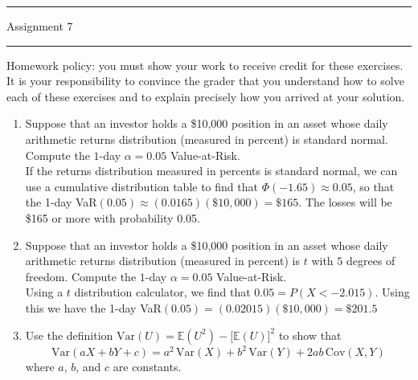 \documentclass[letterpaper,12pt,fleqn]{article}
\begin{document}
\pagestyle{empty}

\hrule \vspace{0.5em}
 \hfill Assignment 7 \newline \hrule

\vspace{1em}

Homework policy: you must show your work to receive credit for these exercises.  It is your responsibility to convince the grader that you understand how to solve each of these exercises and to explain precisely how you arrived at your solution.

\vspace{1em}

\begin{enumerate}
\item Suppose that an investor holds a \$10,000 position in an asset whose daily arithmetic returns distribution (measured in percent) is standard normal.  Compute the $1$-day $\alpha=0.05$ Value-at-Risk.
\\

If the returns distribution measured in percents is standard normal, we can use a cumulative distribution table to find that $\Phi(-1.65) \approx 0.05$, so that the 1-day VaR$(0.05) \approx (0.0165)(\$10,000) = \$165$. The losses will be \$165 or more with probability 0.05. 

\vspace{2em}

\item Suppose that an investor holds a \$10,000 position in an asset whose daily arithmetic returns distribution (measured in percent) is $t$ with $5$ degrees of freedom.  Compute the $1$-day $\alpha=0.05$ Value-at-Risk.
\\

Using a $t$ distribution calculator, we find that $0.05=P(X<-2.015)$. Using this we have the 1-day VaR$(0.05) = (0.02015)(\$10,000) = \$201.5$

\vspace{2em}

\item Use the definition $\mbox{Var}(U) = \mathbb{E}(U^{2}) - \big[ \mathbb{E}(U) \big]^2$ to show that
\begin{equation*}
\mbox{Var}(aX + bY + c) = a^{2} \, \mbox{Var}(X) + b^{2} \, \mbox{Var}(Y) + 2ab \, \mbox{Cov}(X, Y)
\end{equation*}
where $a$, $b$, and $c$ are constants.
\\


\end{enumerate}
\end{document}
